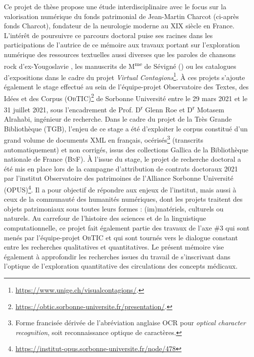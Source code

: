 Ce projet de thèse propose une étude interdisciplinaire avec le focus sur la valorisation numérique du fonds patrimonial de Jean-Martin Charcot (ci-après \og{}fonds Charcot\fg{}), fondateur de la neurologie moderne au XIX\ieme{} siècle en France. 
L'intérêt de poursuivre ce parcours doctoral puise ses racines dans les participations de l'autrice de ce mémoire aux travaux portant sur l'exploration numérique des ressources textuelles aussi diverses que les paroles de chansons rock d'ex-Yougoslavie \citep{petkovic2019creation}, les manuscrits de M\textsuperscript{me} de Sévigné (\citealp{gabay2020quantifying,gabay2021katabase}) ou les catalogues d'expositions dans le cadre du projet \textit{Virtual Contagions}\footnote{\url{https://www.unige.ch/visualcontagions/}.}. 
À ces projets s'ajoute également le stage effectué au sein de l'équipe-projet Observatoire des Textes, des Idées et des Corpus (\textsc{ObTIC})\footnote{\url{https://obtic.sorbonne-universite.fr/presentation/}.} de Sorbonne Université entre le 29 mars 2021 et le 31 juillet 2021, sous l'encadrement de Prof. D\textsuperscript{r} Glenn Roe et D\textsuperscript{r} Motasem Alrahabi, ingénieur de recherche. Dans le cadre du projet de la Très Grande Bibliothèque (\textsc{TGB}), l'enjeu de ce stage a été d'exploiter le corpus constitué d'un grand volume de documents \textsc{XML} en français, océrisés\footnote{Forme francisée dérivée de l'abréviation anglaise \textsc{OCR} pour \textit{optical character recognition}, soit \og{}reconnaissance optique de caractères\fg{}.} (transcrits automatiquement) et non corrigés, issus des collections Gallica de la Bibliothèque nationale de France (\textsc{BnF}). 
À l'issue du stage, le projet de recherche doctoral a été mis en place lors de la campagne d'attribution de contrats doctoraux 2021 par l'institut Observatoire des patrimoines de l'Alliance Sorbonne Université (\textsc{OPUS})\footnote{\url{https://institut-opus.sorbonne-universite.fr/node/478}}. Il a pour objectif de répondre aux enjeux de l'institut, mais aussi à ceux de la communauté des humanités numériques, dont les projets traitent des objets patrimoniaux sous toutes leurs formes : (im)matériels, culturels ou naturels. Au carrefour de l'histoire des sciences et de la linguistique computationnelle, ce projet fait également partie des travaux de l'axe \#3 qui sont menés par l'équipe-projet \textsc{ObTIC} et qui sont tournés vers le dialogue constant entre les recherches qualitatives et quantitatives. Le présent mémoire vise également à approfondir les recherches issues du travail de \citet{petkovic2023circulation} s'inscrivant dans l'optique de l'exploration quantitative des circulations des concepts médicaux. 

